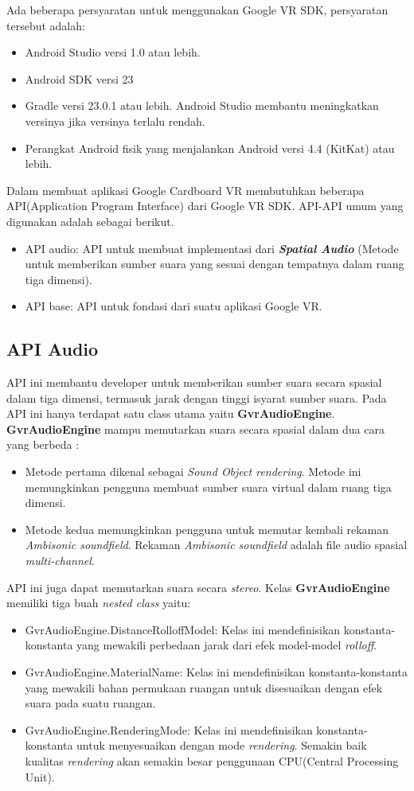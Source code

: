 Ada beberapa persyaratan untuk menggunakan Google VR SDK, persyaratan tersebut adalah:
\begin{itemize}
	\item Android Studio versi 1.0 atau lebih.
	\item Android SDK versi 23
	\item Gradle versi 23.0.1 atau lebih. Android Studio membantu meningkatkan versinya jika versinya terlalu rendah.
	\item Perangkat Android fisik yang menjalankan Android versi 4.4 (KitKat) atau lebih.
\end{itemize}

Dalam membuat aplikasi Google Cardboard VR membutuhkan beberapa API(Application Program Interface) dari Google VR SDK. API-API umum yang digunakan adalah sebagai berikut. 
\begin{itemize}
	\item API audio: API untuk membuat implementasi dari \textbf{\textit{Spatial Audio}} (Metode untuk memberikan sumber suara yang sesuai dengan tempatnya dalam ruang tiga dimensi).
	\item API base: API untuk fondasi dari suatu aplikasi Google VR.
\end{itemize}

\subsection{API Audio}
\label{sec:api_audio}

API ini membantu developer untuk memberikan sumber suara secara spasial dalam tiga dimensi, termasuk jarak dengan tinggi isyarat sumber suara. Pada API ini hanya terdapat satu class utama yaitu \textbf{GvrAudioEngine}. \textbf{GvrAudioEngine} mampu memutarkan suara secara spasial dalam dua cara yang berbeda :
\begin{itemize}
	\item Metode pertama dikenal sebagai \textit{Sound Object rendering}. Metode ini memungkinkan pengguna membuat sumber suara virtual dalam ruang tiga dimensi.
	\item Metode kedua memungkinkan pengguna untuk memutar kembali rekaman \textit{Ambisonic soundfield}. Rekaman \textit{Ambisonic soundfield} adalah file audio spasial \textit{multi-channel}.
\end{itemize}
API ini juga dapat memutarkan suara secara \textit{stereo}. Kelas \textbf{GvrAudioEngine} memiliki tiga buah \textit{nested class} yaitu:
\begin{itemize}
	\item GvrAudioEngine.DistanceRolloffModel: Kelas ini mendefinisikan konstanta-konstanta yang mewakili perbedaan jarak dari efek model-model \textit{rolloff}. 
	\item GvrAudioEngine.MaterialName: Kelas ini mendefinisikan konstanta-konstanta yang mewakili bahan permukaan ruangan untuk disesuaikan dengan efek suara pada suatu ruangan.
	\item GvrAudioEngine.RenderingMode: Kelas ini mendefinisikan konstanta-konstanta untuk menyesuaikan dengan mode \textit{rendering}. Semakin baik kualitas \textit{rendering} akan semakin besar penggunaan CPU(Central Processing Unit).
\end{itemize}

